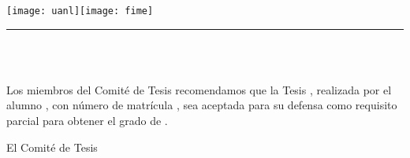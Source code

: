 {\renewcommand{\baselinestretch}{1.1}\selectfont
\begin{center}\vspace*{-25mm}\hspace*{-10mm}
\begin{minipage}{170.5mm}
\hspace{-1.5mm}\texttt{[image: uanl]}\hfill{}\hbox{\texttt{[image: fime]}}
\hrule\vspace{0.5mm}
\scalebox{.5}{\MakeUppercase{\uanl}}\hfill\scalebox{.5}{\MakeUppercase{\fime}}\medskip
\end{minipage}
\vskip4mm{\sc\large\uanl\\\fime\\[3pt]\depg}\vskip6mm
\end{center}

Los miembros del Comité de Tesis recomendamos que la Tesis \textit{\titulo}, realizada por el alumno \autor, con número de matrícula \matricula, sea aceptada para su defensa como requisito parcial para obtener el grado de \grado\orientacion.

\begin{center}
El Comité de Tesis\\
\ifdoctorado\vskip15mm\else\vskip25mm\fi


\end{center}}

